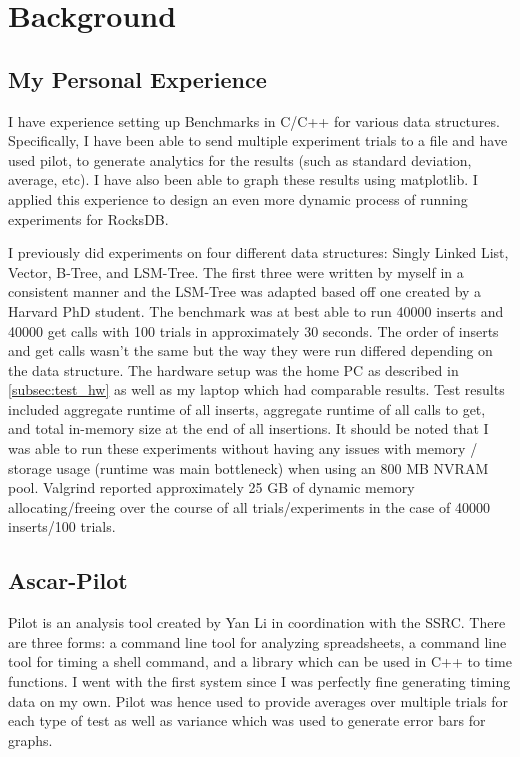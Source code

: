 \documentclass[twocolumn,11pt]{article}
\begin{document}
\section{Background}
\label{sec:background}

\subsection{My Personal Experience}
\label{subsec:personal_experience}

I have experience setting up Benchmarks in C/C++ for various data structures.
Specifically, I have been able to send multiple experiment trials to a file and
have used pilot, to generate analytics for the results (such as standard
deviation, average, etc). I have also been able to graph these results using
matplotlib. I applied this experience to design an even more dynamic process of
running experiments for RocksDB.

I previously did experiments on four different data structures: Singly Linked
List, Vector, B-Tree, and LSM-Tree. The first three were written by myself in a
consistent manner and the LSM-Tree was adapted based off one created by a
Harvard PhD student. The benchmark was at best able to run 40000 inserts and
40000 get calls with 100 trials in approximately 30 seconds. The order of
inserts and get calls wasn't the same but the way they were run differed
depending on the data structure. The hardware setup was the home PC as described
in \ref{subsec:test_hw} as well as my laptop which had comparable results. Test
results included aggregate runtime of all inserts, aggregate runtime of all
calls to get, and total in-memory size at the end of all insertions. It should
be noted that I was able to run these experiments without having any issues with
memory / storage usage (runtime was main bottleneck) when using an 800 MB NVRAM
pool. Valgrind reported approximately 25 GB of dynamic memory allocating/freeing
over the course of all trials/experiments in the case of 40000 inserts/100
trials.

\subsection{Ascar-Pilot}

Pilot\cite{li:pilot} is an analysis tool created by Yan Li in coordination with
the SSRC. There are three forms: a command line tool for analyzing spreadsheets,
a command line tool for timing a shell command, and a library which can be used
in C++ to time functions. I went with the first system since I was perfectly
fine generating timing data on my own. Pilot was hence used to provide averages
over multiple trials for each type of test as well as variance which was used to
generate error bars for graphs.
\end{document}
